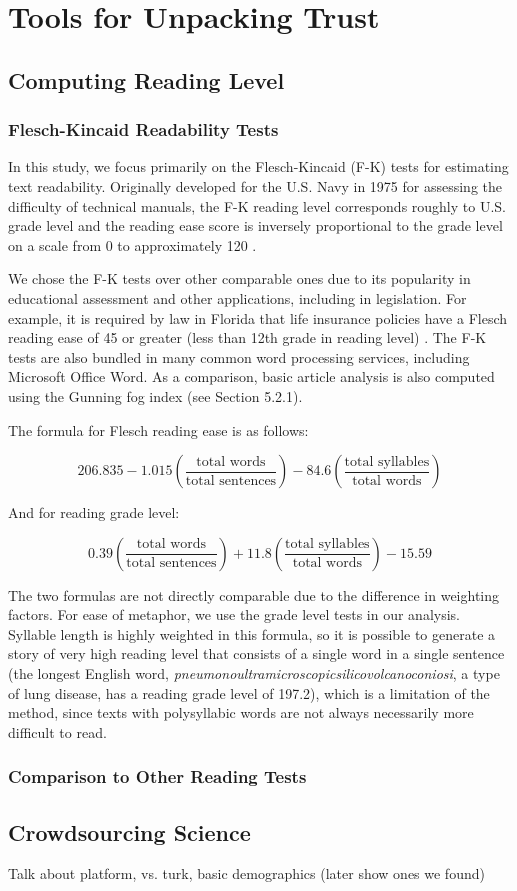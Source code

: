 \chapter{Tools for Unpacking Trust}

\section{Computing Reading Level}
\subsection{Flesch-Kincaid Readability Tests} 
In this study, we focus primarily on the Flesch-Kincaid (F-K) tests for estimating text readability. Originally developed for the U.S. Navy in 1975 for assessing the difficulty of technical manuals, the F-K reading level corresponds roughly to U.S. grade level and the reading ease score is inversely proportional to the grade level on a scale from 0 to approximately 120 \cite{kincaid1975derivation}.

We chose the F-K tests over other comparable ones due to its popularity in educational assessment and other applications, including in legislation. For example, it is required by law in Florida that life insurance policies have a Flesch reading ease of 45 or greater (less than 12th grade in reading level) \cite{Statu37online}. The F-K tests are also bundled in many common word processing services, including Microsoft Office Word. As a comparison, basic article analysis is also computed using the Gunning fog index (see Section 5.2.1).

The formula for Flesch reading ease is as follows:

$$206.835 - 1.015 \left( \frac{\mbox{total words}}{\mbox{total sentences}} \right) - 84.6 \left( \frac{\mbox{total syllables}}{\mbox{total words}} \right)$$

And for reading grade level:

$$0.39 \left ( \frac{\mbox{total words}}{\mbox{total sentences}} \right ) + 11.8 \left ( \frac{\mbox{total syllables}}{\mbox{total words}} \right ) - 15.59$$
 
The two formulas are not directly comparable due to the difference in weighting factors. For ease of metaphor, we use the grade level tests in our analysis. Syllable length is highly weighted in this formula, so it is possible to generate a story of very high reading level that consists of a single word in a single sentence (the longest English word, \emph{pneumonoultramicroscopicsilicovolcanoconiosi}, a type of lung disease, has a reading grade level of 197.2), which is a limitation of the method, since texts with polysyllabic words are not always necessarily more difficult to read.

\subsection{Comparison to Other Reading Tests}

\section{Crowdsourcing Science}
Talk about platform, vs. turk, basic demographics (later show ones we found) 
